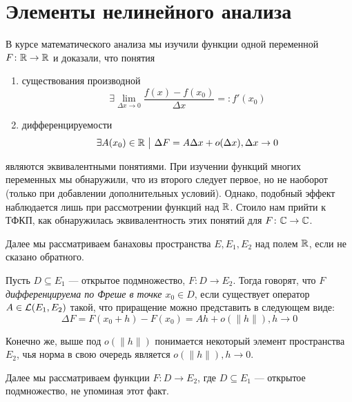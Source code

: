 \section{Элементы нелинейного анализа}

\begin{note}
	В курсе математического анализа мы изучили функции одной переменной $F \colon \mathbb{R} \to \mathbb{R}$ и доказали, что понятия
	\begin{enumerate}
		\item существования производной
		\[
			\exists \lim_{\Delta x \to 0} \frac{f(x) - f(x_0)}{\Delta x} =: f'(x_0)
		\] 
		
		\item дифференцируемости
		\[
			\exists A(x_0) \in \mathbb{R} \ \big|\  \Delta F = A\Delta x + o(\Delta x), \Delta x \to 0
		\]
	\end{enumerate}
	являются эквивалентными понятиями. При изучении функций многих переменных мы обнаружили, что из второго следует первое, но не наоборот (только при добавлении дополнительных условий). Однако, подобный эффект наблюдается лишь при рассмотрении функций над $\mathbb{R}$. Стоило нам прийти к ТФКП, как обнаружилась эквивалентность этих понятий для $F \colon \mathbb{C} \to \mathbb{C}$.
\end{note}

\begin{note}
	Далее мы рассматриваем банаховы пространства $E, E_1, E_2$ над полем $\mathbb{R}$, если не сказано обратного.
\end{note}

\begin{definition}
	Пусть $D \subseteq E_1$ --- открытое подмножество, $F \colon D \to E_2$. Тогда говорят, что $F$ \textit{дифференцируема по Фреше в точке $x_0 \in D$}, если существует оператор $A \in \mathcal{L}(E_1, E_2)$ такой, что приращение можно представить в следующем виде:
	\[
		\Delta F = F(x_0 + h) - F(x_0) = Ah + o(\|h\|), h \to 0
	\]
\end{definition}

\begin{anote}
	Конечно же, выше под $o(\|h\|)$ понимается некоторый элемент пространства $E_2$, чья норма в свою очередь является $o(\|h\|), h \to 0$.
\end{anote}

\begin{note}
	Далее мы рассматриваем функции $F \colon D \to E_2$, где $D \subseteq E_1$ --- открытое подмножество, не упоминая этот факт.
\end{note}

